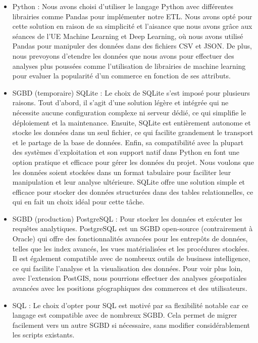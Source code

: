 \begin{itemize}

\item Python : Nous avons choisi d’utiliser le langage Python avec différentes librairies comme Pandas pour implémenter notre ETL. Nous avons opté pour cette solution en raison de sa simplicité et l'aisance que nous avons grâce aux séances de l'UE Machine Learning et Deep Learning, où nous avons utilisé Pandas pour manipuler des données dans des fichiers CSV et JSON\@.
De plus, nous prevoyons d'etendre les données que nous avons pour effectuer des analyses plus poussées comme l'utilisation de librairies de machine learning pour evaluer la popularité d'un commerce en fonction de ses attributs.
\item SGBD (temporaire) SQLite : Le choix de SQLite s’est imposé pour plusieurs raisons. Tout d’abord, il s’agit d’une solution légère et intégrée qui ne nécessite aucune configuration complexe ni serveur dédié,
ce qui simplifie le déploiement et la maintenance. Ensuite, SQLite est entièrement autonome et stocke les données dans un seul fichier, ce qui facilite grandement le transport et le
partage de la base de données. Enfin, sa compatibilité avec la plupart des systèmes d’exploitation et son support natif dans Python en font une option pratique et efficace pour
gérer les données du projet. Nous voulons que les données soient stockées dans un format tabulaire pour faciliter leur manipulation et leur analyse ultérieure.
SQLite offre une solution simple et efficace pour stocker des données structurées dans des tables relationnelles, ce qui en fait un choix idéal pour cette tâche.
\item SGBD (production) PostgreSQL : Pour stocker les données et exécuter les requêtes analytiques.
PostgreSQL est un SGBD open-source (contrairement à Oracle) qui offre des fonctionnalités avancées pour les entrepôts de données, telles que les index avancés, les vues matérialisées et les procédures stockées.
Il est également compatible avec de nombreux outils de business intelligence, ce qui facilite l’analyse et la visualisation des données. Pour voir plus loin, avec l'extension PostGIS, nous pourrions effectuer des analyses géospatiales avancées avec les positions géographiques des commerces et des utilisateurs.
\item SQL : Le choix d'opter pour SQL est motivé par sa flexibilité notable car ce langage est compatible avec de nombreux SGBD. Cela permet de migrer facilement vers un autre SGBD si nécessaire, sans modifier considérablement les scripts existants.

\end{itemize}
